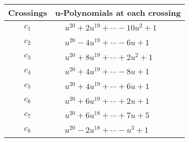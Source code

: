 \documentclass[1p]{elsarticle_modified}
\theoremstyle{definition}
\begin{document}
\begin{tabular}{m{50pt}|m{274pt}}
Crossings & \hspace{64pt}u-Polynomials at each crossing \\
\hline $$\begin{aligned}c_{1}\end{aligned}$$&$\begin{aligned}
&u^{20}+2 u^{19}+\cdots-10 u^2+1
\end{aligned}$\\
\hline $$\begin{aligned}c_{2}\end{aligned}$$&$\begin{aligned}
&u^{20}-4 u^{19}+\cdots-6 u+1
\end{aligned}$\\
\hline $$\begin{aligned}c_{3}\end{aligned}$$&$\begin{aligned}
&u^{20}+8 u^{19}+\cdots+2 u^2+1
\end{aligned}$\\
\hline $$\begin{aligned}c_{4}\end{aligned}$$&$\begin{aligned}
&u^{20}+4 u^{19}+\cdots-8 u+1
\end{aligned}$\\
\hline $$\begin{aligned}c_{5}\end{aligned}$$&$\begin{aligned}
&u^{20}+4 u^{19}+\cdots+6 u+1
\end{aligned}$\\
\hline $$\begin{aligned}c_{6}\end{aligned}$$&$\begin{aligned}
&u^{20}+6 u^{19}+\cdots+2 u+1
\end{aligned}$\\
\hline $$\begin{aligned}c_{7}\end{aligned}$$&$\begin{aligned}
&u^{20}+6 u^{18}+\cdots+7 u+5
\end{aligned}$\\
\hline $$\begin{aligned}c_{8}\end{aligned}$$&$\begin{aligned}
&u^{20}-2 u^{18}+\cdots- u^3+1
\end{aligned}$\\

\end{tabular}
\end{document}
